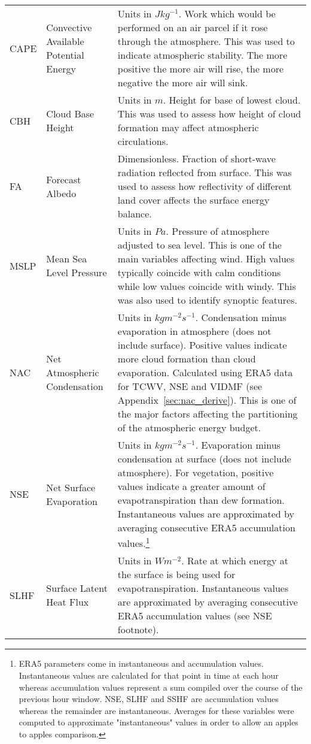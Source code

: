 \begin{landscape}
\begin{longtable}{P{2cm}P{3cm}P{15cm}}
			CAPE & Convective Available Potential Energy & Units in $J kg^{-1}$. Work which would be performed on an air parcel if it rose through the atmosphere. This was used to indicate atmospheric stability. The more positive the more air will rise, the more negative the more air will sink. \\
			CBH & Cloud Base Height & Units in $m$. Height for base of lowest cloud. This was used to assess how height of cloud formation may affect atmospheric circulations. \\
			FA & Forecast Albedo & Dimensionless. Fraction of short-wave radiation reflected from surface. This was used to assess how reflectivity of different land cover affects the surface energy balance. \\
			MSLP & Mean Sea Level Pressure & Units in $Pa$. Pressure of atmosphere adjusted to sea level. This is one of the main variables affecting wind. High values typically coincide with calm conditions while low values coincide with windy. This was also used to identify synoptic features. \\
			NAC & Net Atmospheric Condensation & Units in $kg m^{-2} s^{-1}$. Condensation minus evaporation in atmosphere (does not include surface). Positive values indicate more cloud formation than cloud evaporation. Calculated using ERA5 data for TCWV, NSE and VIDMF (see Appendix~\ref{sec:nac_derive}). This is one of the major factors affecting the partitioning of the atmospheric energy budget. \\
			NSE & Net Surface Evaporation & Units in $kg m^{-2} s^{-1}$. Evaporation minus condensation at surface (does not include atmosphere). For vegetation, positive values indicate a greater amount of evapotranspiration than dew formation. Instantaneous values are approximated by averaging consecutive ERA5 accumulation values.\footnote{ERA5 parameters come in instantaneous and accumulation values. Instantaneous values are calculated for that point in time at each hour whereas accumulation values represent a sum compiled over the course of the previous hour window. NSE, SLHF and SSHF are accumulation values whereas the remainder are instantaneous. Averages for these variables were computed to approximate "instantaneous" values in order to allow an apples to apples comparison.} \\
			SLHF & Surface Latent Heat Flux & Units in $W m^{-2}$. Rate at which energy at the surface is being used for evapotranspiration. Instantaneous values are approximated by averaging consecutive ERA5 accumulation values (see NSE footnote). \\

\end{longtable}
\end{landscape}
